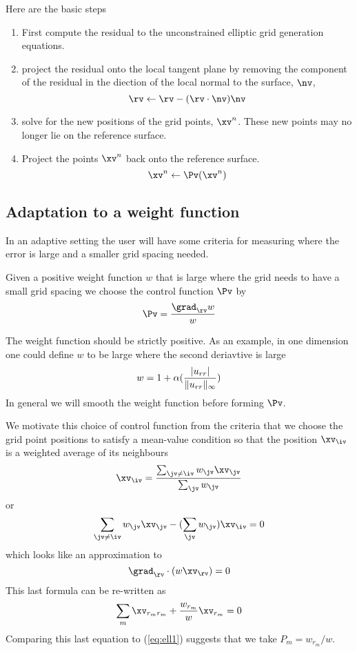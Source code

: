 Here are the basic steps
\begin{enumerate}
  \item First compute the residual to the unconstrained elliptic grid generation equations.
  \item project the residual onto the local tangent plane by removing the component of the
residual in the diection of the local normal to the surface, $\nv$,
\[
      \rv \leftarrow \rv - (\rv\cdot\nv) \nv
\]
   \item solve for the new positions of the grid points, $\xv^n$. These new points may no longer lie
     on the reference surface.
   \item  Project the points $\xv^n$ back onto the reference surface.
\[
         \xv^n \leftarrow \Pv( \xv^n )
\]
\end{enumerate}


\subsection{Adaptation to a weight function}

In an adaptive setting the user will have some criteria for measuring where
the error is large and a smaller grid spacing needed.

Given a positive weight function $w$ that is large where the grid needs to have
a small grid spacing we choose the control function $\Pv$ by
\[
   \Pv = {\grad_\rv w \over w}
\]

The weight function should be strictly positive. As an example, in one dimension one could
define $w$ to be large where the second deriavtive is large
\[
    w = 1 + \alpha ( { | u_{rr} | \over  \| u_{rr} \|_\infty } )
\]
In general we will smooth the weight function before forming $\Pv$.

We motivate this choice of control function from the criteria that 
we choose the grid point positions to satisfy a mean-value condition
so that the position $\xv_\iv$ is a weighted average of its neighbours
\[
    \xv_\iv = { \sum_{\jv\ne\iv} w_\jv \xv_\jv \over \sum_\jv w_\jv }
\]
or
\[
  \sum_{\jv\ne\iv} w_\jv \xv_\jv  - (\sum_\jv w_\jv) \xv_\iv = 0
\]
which looks like an approximation to
\[
  \grad_\rv \cdot( w \xv_\rv) = 0 
\]     
This last formula can be re-written as
\begin{equation}
    \sum_m \xv_{r_m r_m}  + {w_{r_m}\over w } \xv_{r_m} = 0  \label{eq:ell2}
\end{equation}
Comparing this last equation to (\ref{eq:ell1}) suggests that we take $P_m = {w_{r_m} / w }$.



 



